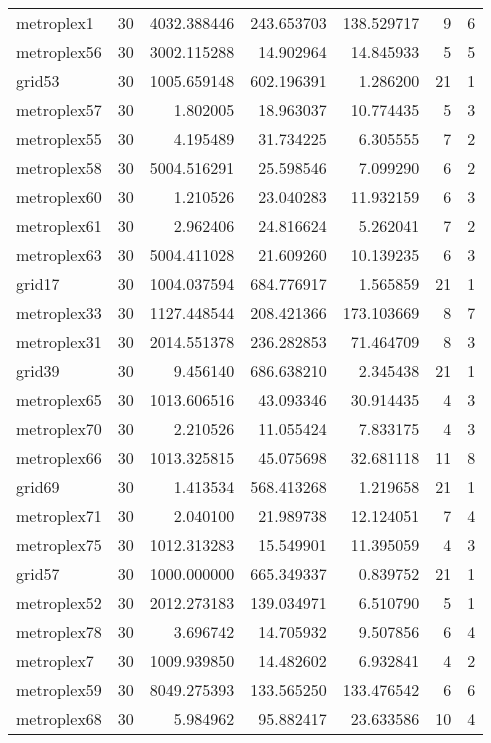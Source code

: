 \begin{longtable}{|l|r|r|r|r|r|r|}
metroplex1 & 30 & 4032.388446 & 243.653703 & 138.529717 & 9 & 6 \\
metroplex56 & 30 & 3002.115288 & 14.902964 & 14.845933 & 5 & 5 \\
grid53 & 30 & 1005.659148 & 602.196391 & 1.286200 & 21 & 1 \\
metroplex57 & 30 & 1.802005 & 18.963037 & 10.774435 & 5 & 3 \\
metroplex55 & 30 & 4.195489 & 31.734225 & 6.305555 & 7 & 2 \\
metroplex58 & 30 & 5004.516291 & 25.598546 & 7.099290 & 6 & 2 \\
metroplex60 & 30 & 1.210526 & 23.040283 & 11.932159 & 6 & 3 \\
metroplex61 & 30 & 2.962406 & 24.816624 & 5.262041 & 7 & 2 \\
metroplex63 & 30 & 5004.411028 & 21.609260 & 10.139235 & 6 & 3 \\
grid17 & 30 & 1004.037594 & 684.776917 & 1.565859 & 21 & 1 \\
metroplex33 & 30 & 1127.448544 & 208.421366 & 173.103669 & 8 & 7 \\
metroplex31 & 30 & 2014.551378 & 236.282853 & 71.464709 & 8 & 3 \\
grid39 & 30 & 9.456140 & 686.638210 & 2.345438 & 21 & 1 \\
metroplex65 & 30 & 1013.606516 & 43.093346 & 30.914435 & 4 & 3 \\
metroplex70 & 30 & 2.210526 & 11.055424 & 7.833175 & 4 & 3 \\
metroplex66 & 30 & 1013.325815 & 45.075698 & 32.681118 & 11 & 8 \\
grid69 & 30 & 1.413534 & 568.413268 & 1.219658 & 21 & 1 \\
metroplex71 & 30 & 2.040100 & 21.989738 & 12.124051 & 7 & 4 \\
metroplex75 & 30 & 1012.313283 & 15.549901 & 11.395059 & 4 & 3 \\
grid57 & 30 & 1000.000000 & 665.349337 & 0.839752 & 21 & 1 \\
metroplex52 & 30 & 2012.273183 & 139.034971 & 6.510790 & 5 & 1 \\
metroplex78 & 30 & 3.696742 & 14.705932 & 9.507856 & 6 & 4 \\
metroplex7 & 30 & 1009.939850 & 14.482602 & 6.932841 & 4 & 2 \\
metroplex59 & 30 & 8049.275393 & 133.565250 & 133.476542 & 6 & 6 \\
metroplex68 & 30 & 5.984962 & 95.882417 & 23.633586 & 10 & 4 \\

\end{longtable}
